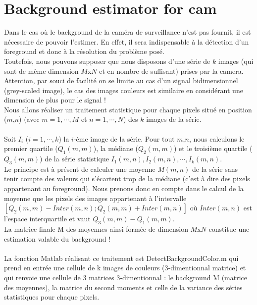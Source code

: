 \chapter{Background estimator for cam}

Dans le cas où le background de la caméra de surveillance n'est pas fournit, il est nécessaire de pouvoir l'estimer. En effet, il sera indispensable à la détection d'un foreground et donc à la résolution du problème posé. 
\\
Toutefois, nous pouvons supposer que nous disposons d'une série de $k$ images (qui sont de même dimension $M$x$N$ et en nombre de suffisant) prises par la camera. Attention, par souci de facilité on se limite au cas d'un signal bidimensionnel (grey-scaled image), le cas des images couleurs est similaire en considérant une dimension de plus pour le signal ! 
\\
Nous allons réaliser un traitement statistique pour chaque pixels situé en position ($m$,$n$) (avec $m = 1,\cdots,M$ et $n = 1,\cdots,N$) des $k$ images de la série.
\\
\\
Soit $I_i$ ($i = 1,\cdots,k$) la $i$-ème image de la série. Pour tout $m$,$n$, nous calculons le premier quartile ($Q_1 (m,m)$), la médiane ($Q_2 (m,m)$) et le troisième quartile ($Q_3 (m,m)$) de la série statistique $I_1 (m,n), I_2 (m,n), \cdots, I_k (m,n)$. 
\\
Le principe est à présent de calculer une moyenne $M(m,n)$ de la série sans tenir compte des valeurs qui s'écartent trop de la médiane (c'est à dire des pixels appartenant au foreground). Nous prenons donc en compte dans le calcul de la moyenne que les pixels des images appartenant à l'intervalle $[Q_2 (m,m) - Inter(m,n);Q_2 (m,m) + Inter(m,n)]$ où $Inter(m,n)$ est l'espace interquartile et vaut $Q_3 (m,m) - Q_1 (m,m)$.
\\
La matrice finale M des moyennes ainsi formée de dimension $M$x$N$ constitue une estimation valable du background !
\\
\\
La fonction Matlab réalisant ce traitement est DetectBackgroundColor.m qui prend en entrée une cellule de k images de couleurs (3-dimentionnal matrice) et qui renvoie une cellule de 3 matrices 3-dimentionnal : le background M (matrice des moyennes), la matrice du second moments et celle de la variance des séries statistiques pour chaque pixels.